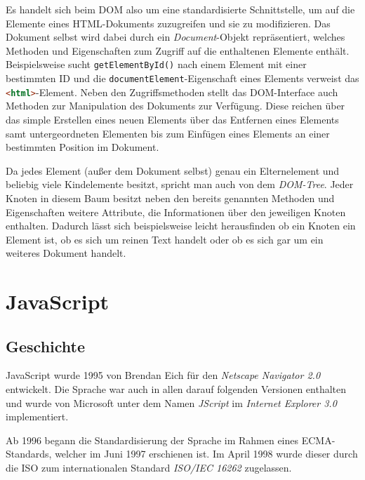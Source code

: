 Es handelt sich beim DOM also um eine standardisierte Schnittstelle, um auf die Elemente eines
HTML-Dokuments zuzugreifen und sie zu modifizieren. Das Dokument selbst wird dabei durch ein
\emph{Document}-Objekt repräsentiert, welches Methoden und Eigenschaften zum Zugriff auf die
enthaltenen Elemente enthält. Beispielsweise sucht \lstinline{getElementById()} nach
einem Element mit einer bestimmten ID und die \lstinline{documentElement}-Eigenschaft eines Elements
verweist das \lstinline[language=HTML]{<html>}-Element. Neben den Zugriffsmethoden stellt das
DOM-Interface auch Methoden zur Manipulation des Dokuments zur Verfügung. Diese reichen über das
simple Erstellen eines neuen Elements über das Entfernen eines Elements samt untergeordneten
Elementen bis zum Einfügen eines Elements an einer bestimmten Position im Dokument.

Da jedes Element (außer dem Dokument selbst) genau ein Elternelement und beliebig viele Kindelemente
besitzt, spricht man auch von dem \emph{DOM-Tree}. Jeder Knoten in diesem Baum besitzt neben den
bereits genannten Methoden und Eigenschaften weitere Attribute, die Informationen über den
jeweiligen Knoten enthalten. Dadurch lässt sich beispielsweise leicht herausfinden ob ein Knoten ein
Element ist, ob es sich um reinen Text handelt oder ob es sich gar um ein weiteres Dokument handelt.







\section{JavaScript}

\subsection{Geschichte}

JavaScript wurde 1995 von Brendan Eich für den \emph{Netscape Navigator 2.0} entwickelt. Die Sprache
war auch in allen darauf folgenden Versionen enthalten und wurde von Microsoft unter dem Namen
\emph{JScript} im \emph{Internet Explorer 3.0} implementiert.

Ab 1996 begann die Standardisierung der Sprache im Rahmen eines ECMA-Standards, welcher im Juni 1997
erschienen ist. Im April 1998 wurde dieser durch die ISO zum internationalen Standard \emph{ISO/IEC
16262} zugelassen.

